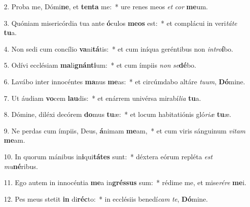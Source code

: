 2. Proba me, Dómi\textbf{ne}, et \textbf{ten}\textbf{ta} me:~*  ure renes meos \textit{et} \textit{cor} \textbf{me}um.\

3. Quóniam misericórdia tua ante \textbf{ó}culos \textbf{me}\textbf{os} est:~*  et complácui in veri\textit{tá}\textit{te} \textbf{tu}a.\

4. Non sedi cum concílio \textbf{va}ni\textbf{tá}tis:~*  et cum iníqua geréntibus non \textit{in}\textit{tro}\textbf{í}bo.\

5. Odívi ecclésiam \textbf{ma}li\textbf{gnán}\textbf{ti}um:~*  et cum ímpiis \textit{non} \textit{se}\textbf{dé}bo.\

6. Lavábo inter innocéntes \textbf{ma}nus \textbf{me}as:~*  et circúmdabo altáre \textit{tu}\textit{um}, \textbf{Dó}mine.\

7. Ut áudiam \textbf{vo}cem \textbf{lau}dis:~*  et enárrem univérsa mirabí\textit{li}\textit{a} \textbf{tu}a.\

8. Dómine, diléxi decórem \textbf{do}mus \textbf{tu}æ:~*  et locum habitatiónis gló\textit{ri}\textit{æ} \textbf{tu}æ.\

9. Ne perdas cum ímpiis, Deus, \textbf{á}nimam \textbf{me}am,~*  et cum viris sánguinum \textit{vi}\textit{tam} \textbf{me}am.\

10. In quorum mánibus in\textbf{i}qui\textbf{tá}\textbf{tes} sunt:~*  déxtera eórum repléta \textit{est} \textit{mu}\textbf{né}ribus.\

11. Ego autem in innocéntia \textbf{me}a in\textbf{grés}\textbf{sus} sum:~*  rédime me, et mise\textit{ré}\textit{re} \textbf{me}i.\

12. Pes meus stetit \textbf{in} di\textbf{réc}to:~*  in ecclésiis benedí\textit{cam} \textit{te}, \textbf{Dó}mine.\

